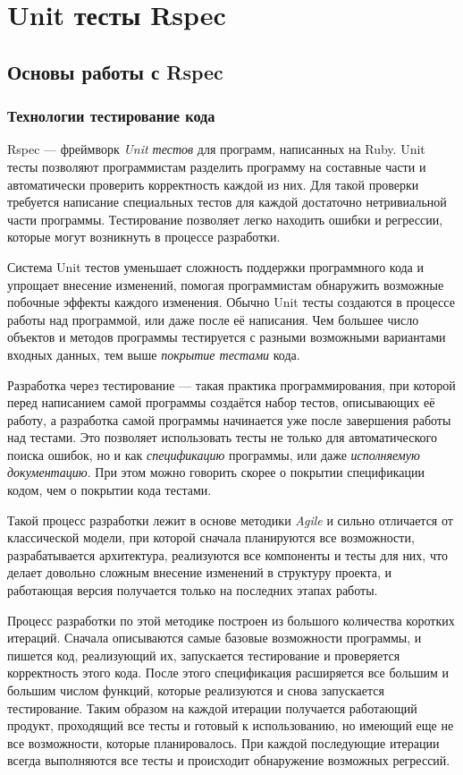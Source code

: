 \chapter{Unit тесты Rspec}

\section{Основы работы с Rspec}

\subsection{Технологии тестирование кода}

Rspec --- фреймворк \emph{Unit тестов} для программ, написанных на Ruby. Unit тесты позволяют программистам разделить программу на составные части и автоматически проверить корректность каждой из них. Для такой проверки требуется написание специальных тестов для каждой достаточно нетривиальной части программы. Тестирование позволяет легко находить ошибки и регрессии, которые могут возникнуть в процессе разработки.

Система Unit тестов уменьшает сложность поддержки программного кода и упрощает внесение изменений, помогая программистам обнаружить возможные побочные эффекты каждого изменения. Обычно Unit тесты создаются в процессе работы над программой, или даже после её написания. Чем большее число объектов и методов программы тестируется с разными возможными вариантами входных данных, тем выше \emph{покрытие тестами} кода.

Разработка через тестирование --- такая практика программирования, при которой перед написанием самой программы создаётся набор тестов, описывающих её работу, а разработка самой программы начинается уже после завершения работы над тестами. Это позволяет использовать тесты не только для автоматического поиска ошибок, но и как \emph{спецификацию} программы, или даже \emph{исполняемую документацию}. При этом можно говорить скорее о покрытии спецификации кодом, чем о покрытии кода тестами.

Такой процесс разработки лежит в основе методики \emph{Agile} и сильно отличается от классической модели, при которой сначала планируются все возможности, разрабатывается архитектура, реализуются все компоненты и тесты для них, что делает довольно сложным внесение изменений в структуру проекта, и работающая версия получается только на последних этапах работы.

Процесс разработки по этой методике построен из большого количества коротких итераций. Сначала описываются самые базовые возможности программы, и пишется код, реализующий их, запускается тестирование и проверяется корректность этого кода. После этого спецификация расширяется все большим и большим числом функций, которые реализуются и снова запускается тестирование. Таким образом на каждой итерации получается работающий продукт, проходящий все тесты и готовый к использованию, но имеющий еще не все возможности, которые планировалось. При каждой последующие итерации всегда выполняются все тесты и происходит обнаружение возможных регрессий.

